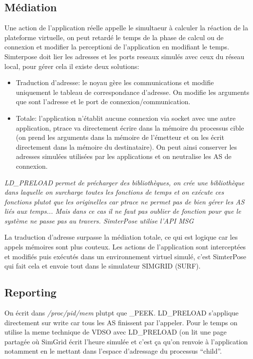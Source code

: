 \documentclass{article}
\begin{document}
\subsection{Médiation}
Une action de l'application réelle appelle le simultaeur à calculer la réaction
de la plateforme virtuelle, on peut retardé le temps de la phase de calcul ou de
connexion et modifier la perceptioni de l'application en modifiant le
temps. Simterpose doit lier les adresses et les ports reseaux simulés avec ceux
du réseau local, pour gérer cela il existe deux solutions:
\begin{itemize}
\item Traduction d'adresse: le noyau gère les communications et modifie
  uniquement le tableau de correspondance d'adresse. On modifie les arguments
  que sont l'adresse et le port de connexion/communication.
\item Totale: l'application n'établit aucune connexion via socket avec une autre
  application, ptrace va directement écrire dans la mémoire du processus cible
  (on prend les arguments dans la mémoire de l'émetteur et on les écrit
  directement dans la mémoire du destinataire). On peut ainsi conserver les
  adresses simulées utilisées par les applications et on neutralise les AS de
  connexion.
\end{itemize}

\textit{LD\_PRELOAD permet de précharger des bibliothèques, on crée une
  bibliothèque dans laquelle on surcharge toutes les fonctions de temps et on
  exécute ces fonctions plutot que les originelles car ptrace ne permet pas de
  bien gérer les AS liés aux temps... Mais dans ce cas il ne faut pas oublier de
  fonction pour que le système ne passe pas au travers. SimterPose utilise l'API
  MSG}

La traduction d'adresse surpasse la médiation totale, ce qui est logique car les
appels mémoires sont plus couteux. Les actions de l'application sont
interceptées et modifiés puis exécutés dans un environnement virtuel simulé,
c'est SimterPose qui fait cela et envoie tout dans le simulateur SIMGRID (SURF).

\subsection{Reporting}
On écrit dans \textit{/proc/pid/mem} plutpt que \_PEEK. LD\_PRELOAD s'applique
directement sur write car tous les AS finissent par l'appeler. Pour le temps on
utilise la meme technique de VDSO avec LD\_PRELOAD (on lit une page partagée où
SimGrid écrit l'heure simulée et c'est ça qu'on renvoie à l'application
notamment en le mettant dans l'espace d'adressage du processus ``child''.
\end{document}
